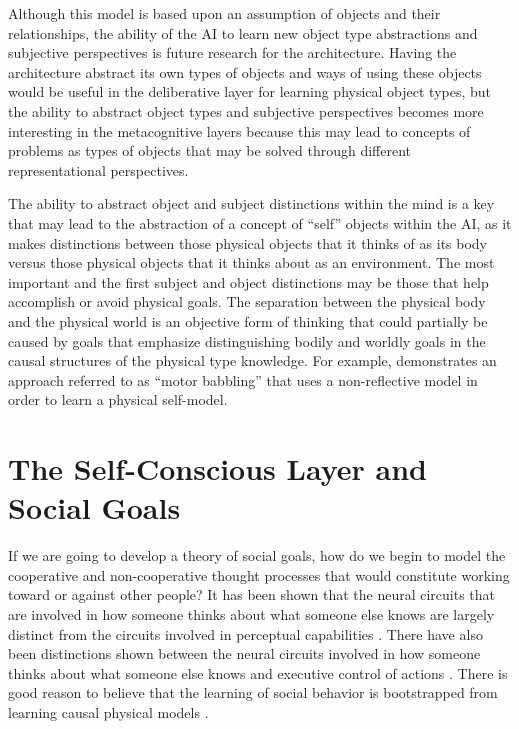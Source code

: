 Although this model is based upon an assumption of objects and their
relationships, the ability of the AI to learn new object type
abstractions and subjective perspectives is future research for the
architecture.  Having the architecture abstract its own types of
objects and ways of using these objects would be useful in the
deliberative layer for learning physical object types, but the ability
to abstract object types and subjective perspectives becomes more
interesting in the metacognitive layers because this may lead to
concepts of problems as types of objects that may be solved through
different representational perspectives.

The ability to abstract object and subject distinctions within the
mind is a key that may lead to the abstraction of a concept of
``self'' objects within the AI, as it makes distinctions between those
physical objects that it thinks of as its body versus those physical
objects that it thinks about as an environment.  The most important
and the first subject and object distinctions may be those that help
accomplish or avoid physical goals.  The separation between the
physical body and the physical world is an objective form of thinking
that could partially be caused by goals that emphasize distinguishing
bodily and worldly goals in the causal structures of the physical type
knowledge.  For example, \cite{bongard:2006} demonstrates an approach
referred to as ``motor babbling'' that uses a non-reflective model in
order to learn a physical self-model.

\section{The Self-Conscious Layer and Social Goals}

If we are going to develop a theory of social goals, how do we begin
to model the cooperative and non-cooperative thought processes that
would constitute working toward or against other people? It has been
shown that the neural circuits that are involved in how someone thinks
about what someone else knows are largely distinct from the circuits
involved in perceptual capabilities \cite[]{bedny:2009}. There have
also been distinctions shown between the neural circuits involved in
how someone thinks about what someone else knows and executive control
of actions \cite[]{saxe:2006}. There is good reason to believe that
the learning of social behavior is bootstrapped from learning causal
physical models \cite[]{perner:1991}.

